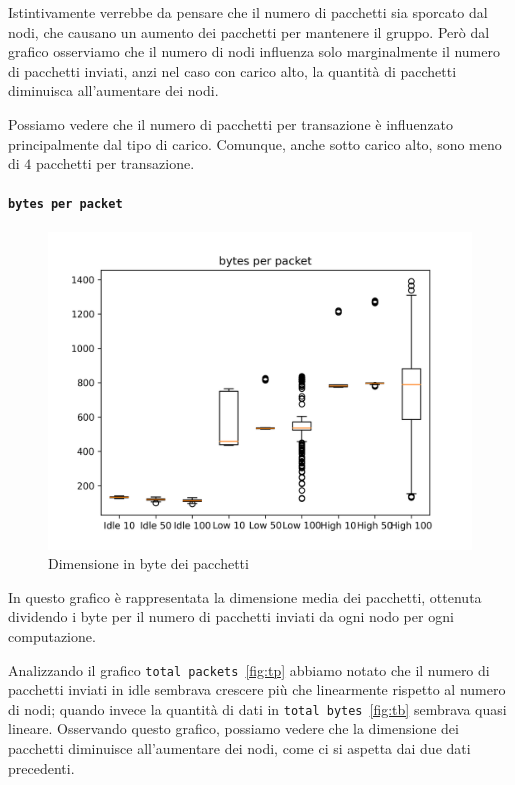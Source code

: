 \documentclass[12pt, a4paper]{article}
\begin{document}
Istintivamente verrebbe da pensare che il numero di pacchetti sia sporcato dal nodi, che causano un aumento dei pacchetti per mantenere il gruppo.
Però dal grafico osserviamo che il numero di nodi influenza solo marginalmente il numero di pacchetti inviati, anzi nel caso con carico alto, la quantità di pacchetti diminuisca all'aumentare dei nodi.

Possiamo vedere che il numero di pacchetti per transazione è influenzato principalmente dal tipo di carico. Comunque, anche sotto carico alto, sono meno di $4$ pacchetti per transazione.

\paragraph{\lstinline{bytes per packet}}

\begin{figure}[H]
    \includegraphics[width=\linewidth, keepaspectratio]{graphs/bytes per packet.png}
    \caption{Dimensione in byte dei pacchetti}
    \label{fig:bp}
\end{figure}

In questo grafico è rappresentata la dimensione media dei pacchetti, ottenuta dividendo i byte per il numero di pacchetti inviati da ogni nodo per ogni computazione.

Analizzando il grafico \lstinline{total packets}~\ref{fig:tp} abbiamo notato che il numero di pacchetti inviati in idle sembrava crescere più che linearmente rispetto al numero di nodi; quando invece la quantità di dati in \lstinline{total bytes}~\ref{fig:tb} sembrava quasi lineare.
Osservando questo grafico, possiamo vedere che la dimensione dei pacchetti diminuisce all'aumentare dei nodi, come ci si aspetta dai due dati precedenti.
\end{document}
